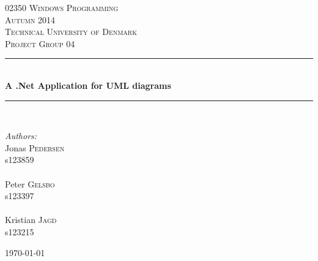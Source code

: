 \documentclass[10pt,a4paper]{article}
\newcommand{\HRule}{\rule{\linewidth}{0.5mm}}
\begin{document}
	\begin{titlepage}
		\begin{center}
			
			
			\textsc{\Large 02350 Windows Programming \\ 
				Autumn 2014 \\ 
				Technical University of Denmark}\\[1.5cm]
			
			\textsc{\Large Project Group 04}\\[0.5cm]
			
			\HRule \\[0.4cm]
			{ \huge \bfseries A .Net Application for UML diagrams \\[0.4cm] }
			
			\HRule \\[1.5cm]
			
			\begin{center}
				\begin{minipage}{0.5\textwidth}
					\begin{flushleft} \large
						\emph{Authors:}\\
						Jonas \textsc{Pedersen} \\
						s123859 \\ ~ \\
						Peter \textsc{Gelsbo} \\
						s123397 \\ ~\\
						Kristian \textsc{Jagd} \\
						s123215
					\end{flushleft}
				\end{minipage}
			\end{center}
			
			
			
			\vfill
			
			{\large \today}
			
		\end{center}
	\end{titlepage}
	
	
	\thispagestyle{empty}
	
	
	\cleardoublepage
	
	
	
    \tableofcontents
	
	\newpage
	
	
	
	
	
	
\end{document}
